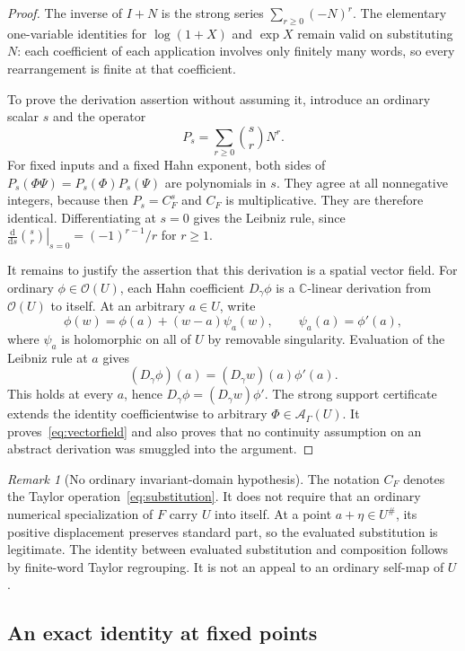 \documentclass[11pt,a4paper]{article}
\numberwithin{equation}{section}
\theoremstyle{definition}
\theoremstyle{remark}
\newtheorem{remark}[theorem]{Remark}
\newcommand{\C}{\mathbb C}
\newcommand{\A}{\mathscr A_\Gamma}
\newcommand{\dd}{\mathrm d}
\newcommand{\Hol}{\mathcal O}
\begin{document}
\begin{proof}
The inverse of $I+N$ is the strong series $\sum_{r\ge0}(-N)^r$.
The elementary one-variable identities for $\log(1+X)$ and $\exp X$ remain
valid on substituting $N$: each coefficient of each application involves
only finitely many words, so every rearrangement is finite at that
coefficient.

To prove the derivation assertion without assuming it, introduce an
ordinary scalar $s$ and the operator
\[
 P_s=\sum_{r\ge0}\binom{s}{r}N^r.
\]
For fixed inputs and a fixed Hahn exponent, both sides of
$P_s(\Phi\Psi)=P_s(\Phi)P_s(\Psi)$ are polynomials in $s$.  They agree at all
nonnegative integers, because then $P_s=C_F^s$ and $C_F$ is multiplicative.
They are therefore identical.  Differentiating at $s=0$ gives the Leibniz
rule, since
$\left.\frac{\dd}{\dd s}\binom{s}{r}\right|_{s=0}=(-1)^{r-1}/r$ for $r\ge1$.

It remains to justify the assertion that this derivation is a spatial
vector field.  For ordinary $\phi\in\Hol(U)$, each Hahn coefficient
$D_\gamma\phi$ is a $\C$-linear derivation from $\Hol(U)$ to itself.  At an
arbitrary $a\in U$, write
\[
 \phi(w)=\phi(a)+(w-a)\psi_a(w),\qquad \psi_a(a)=\phi'(a),
\]
where $\psi_a$ is holomorphic on all of $U$ by removable singularity.
Evaluation of the Leibniz rule at $a$ gives
\[
 (D_\gamma\phi)(a)=(D_\gamma w)(a)\phi'(a).
\]
This holds at every $a$, hence $D_\gamma\phi=(D_\gamma w)\phi'$.
The strong support certificate extends the identity coefficientwise to
arbitrary $\Phi\in\A(U)$.  It proves~\eqref{eq:vectorfield} and also proves
that no continuity assumption on an abstract derivation was smuggled into
the argument.
\end{proof}

\begin{remark}[No ordinary invariant-domain hypothesis]
The notation $C_F$ denotes the Taylor operation~\eqref{eq:substitution}.
It does not require that an ordinary numerical specialization of $F$ carry
$U$ into itself.  At a point $a+\eta\in U^\#$, its positive displacement
preserves standard part, so the evaluated substitution is legitimate.
The identity between evaluated substitution and composition follows by
finite-word Taylor regrouping.  It is not an appeal to an ordinary
self-map of $U$.
\end{remark}

\subsection{An exact identity at fixed points}
\end{document}
